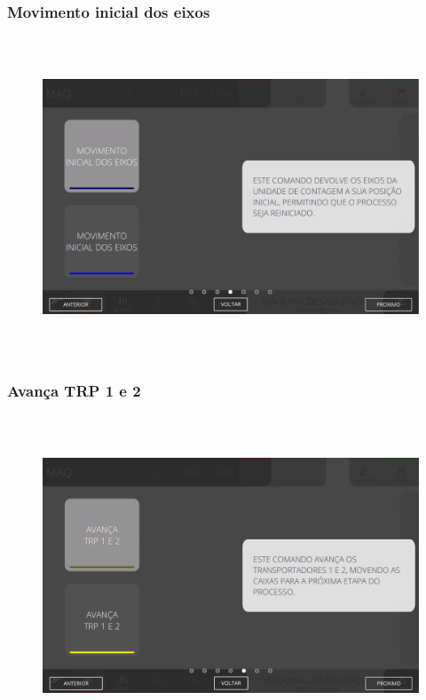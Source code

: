\newpage
\thispagestyle{fancy}
\vspace*{\fill}
\subsubsection{\small{Movimento inicial dos eixos}}
\begin{figure}[h]
  \centering
  \includegraphics[width=576px,height=360px]{src/imagesFlexo/08-count/commands/e-4.png}
\end{figure}
\vspace*{\fill}

\newpage
\thispagestyle{fancy}
\vspace*{\fill}
\subsubsection{\small{Avança TRP 1 e 2}}
\begin{figure}[h]
  \centering
  \includegraphics[width=576px,height=360px]{src/imagesFlexo/08-count/commands/e-5.png}
\end{figure}
\vspace*{\fill}

